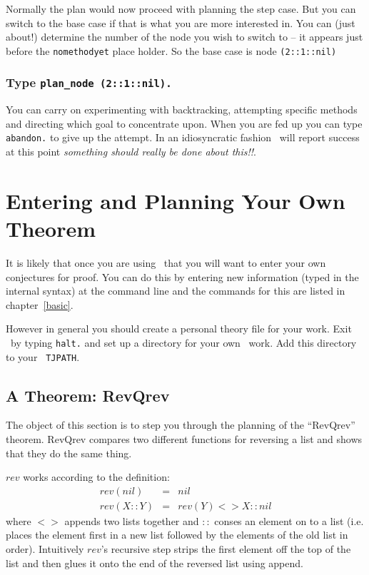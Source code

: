 Normally the plan would now proceed with planning the step
case.  But you can switch to the base 
case if that is 
what you are more interested in.  You can (just about!) determine the
number of the node you wish to switch to -- it appears just before the 
{\tt nomethodyet} place holder.  So the base case
is node {\tt (2::1::nil)}

\subsubsection{Type {\tt plan\_node (2::1::nil).}}
You can carry on experimenting with backtracking, attempting
specific methods and directing which goal to concentrate upon.  When
you are fed up you can type {\tt abandon.} to give up
the attempt.  In an idiosyncratic fashion \lclam\ will report success
at this point {\em something should really be done about this!!}.

\section{Entering and Planning Your Own Theorem}
It is likely that once you are using \lclam\ that you will want to
enter your own conjectures for proof.  You can do this by entering new 
information (typed in the internal syntax) at the command
line and the commands for this are listed in
chapter~\ref{basic}.

However in general you should create a personal theory file for your
work.  Exit \lclam\ by typing {\tt halt.} and set up a directory for
your own \lclam\ work.  Add this directory to your {\tt
TJPATH}.


\subsection{A Theorem: RevQrev}
The object of this section is to step you through the planning of the
``RevQrev'' theorem.  
RevQrev compares two different functions for reversing a list and
shows that they do the same thing.

$rev$ works according to the definition:
\begin{eqnarray}
rev(nil) & = &  nil \label{def:rev1} \\
rev(X::Y) & = & rev(Y) <> X::nil  \label{def:rev2}
\end{eqnarray}
where $<>$\index{$<>$} appends two lists together and $::$\index{$::$} conses an
element on to  
a list (i.e. places the element first in a new list followed by the
elements of the old list in order).  Intuitively
$rev$'s recursive 
step strips the 
first element off the top of the list and then glues it onto the end
of the reversed list using append.   

